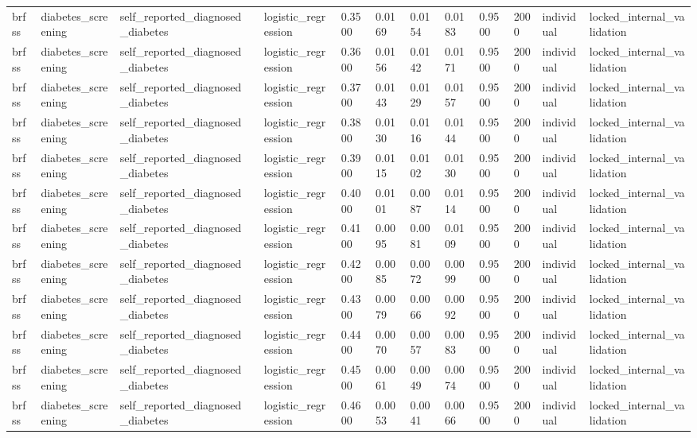 \begin{tabular}{lllllllllllll}
brfss & diabetes\_screening & self\_reported\_diagnosed\_diabetes &  & logistic\_regression & 0.3500 & 0.0169 & 0.0154 & 0.0183 & 0.9500 & 2000 & individual & locked\_internal\_validation \\
brfss & diabetes\_screening & self\_reported\_diagnosed\_diabetes &  & logistic\_regression & 0.3600 & 0.0156 & 0.0142 & 0.0171 & 0.9500 & 2000 & individual & locked\_internal\_validation \\
brfss & diabetes\_screening & self\_reported\_diagnosed\_diabetes &  & logistic\_regression & 0.3700 & 0.0143 & 0.0129 & 0.0157 & 0.9500 & 2000 & individual & locked\_internal\_validation \\
brfss & diabetes\_screening & self\_reported\_diagnosed\_diabetes &  & logistic\_regression & 0.3800 & 0.0130 & 0.0116 & 0.0144 & 0.9500 & 2000 & individual & locked\_internal\_validation \\
brfss & diabetes\_screening & self\_reported\_diagnosed\_diabetes &  & logistic\_regression & 0.3900 & 0.0115 & 0.0102 & 0.0130 & 0.9500 & 2000 & individual & locked\_internal\_validation \\
brfss & diabetes\_screening & self\_reported\_diagnosed\_diabetes &  & logistic\_regression & 0.4000 & 0.0101 & 0.0087 & 0.0114 & 0.9500 & 2000 & individual & locked\_internal\_validation \\
brfss & diabetes\_screening & self\_reported\_diagnosed\_diabetes &  & logistic\_regression & 0.4100 & 0.0095 & 0.0081 & 0.0109 & 0.9500 & 2000 & individual & locked\_internal\_validation \\
brfss & diabetes\_screening & self\_reported\_diagnosed\_diabetes &  & logistic\_regression & 0.4200 & 0.0085 & 0.0072 & 0.0099 & 0.9500 & 2000 & individual & locked\_internal\_validation \\
brfss & diabetes\_screening & self\_reported\_diagnosed\_diabetes &  & logistic\_regression & 0.4300 & 0.0079 & 0.0066 & 0.0092 & 0.9500 & 2000 & individual & locked\_internal\_validation \\
brfss & diabetes\_screening & self\_reported\_diagnosed\_diabetes &  & logistic\_regression & 0.4400 & 0.0070 & 0.0057 & 0.0083 & 0.9500 & 2000 & individual & locked\_internal\_validation \\
brfss & diabetes\_screening & self\_reported\_diagnosed\_diabetes &  & logistic\_regression & 0.4500 & 0.0061 & 0.0049 & 0.0074 & 0.9500 & 2000 & individual & locked\_internal\_validation \\
brfss & diabetes\_screening & self\_reported\_diagnosed\_diabetes &  & logistic\_regression & 0.4600 & 0.0053 & 0.0041 & 0.0066 & 0.9500 & 2000 & individual & locked\_internal\_validation \\

\end{tabular}
